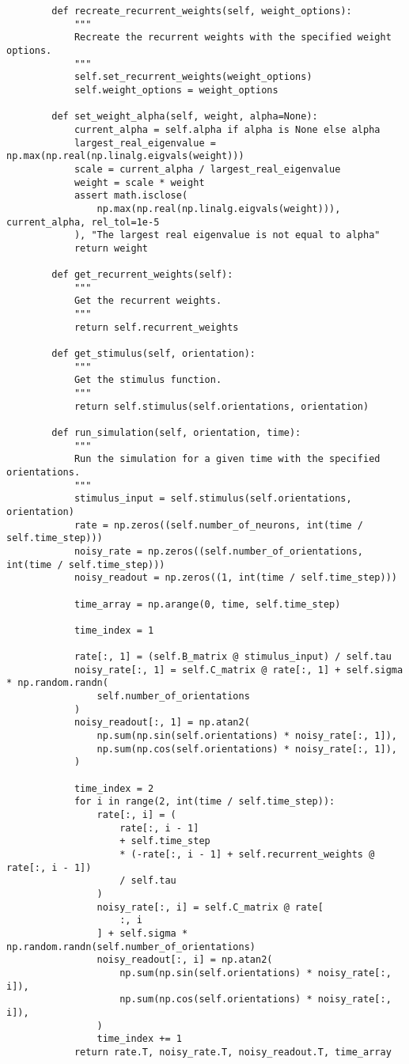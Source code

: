 \documentclass[a4paper, 11pt, oneside]{report}
\begin{document}
\begin{verbatim}
        def recreate_recurrent_weights(self, weight_options):
            """
            Recreate the recurrent weights with the specified weight options.
            """
            self.set_recurrent_weights(weight_options)
            self.weight_options = weight_options
    
        def set_weight_alpha(self, weight, alpha=None):
            current_alpha = self.alpha if alpha is None else alpha
            largest_real_eigenvalue = np.max(np.real(np.linalg.eigvals(weight)))
            scale = current_alpha / largest_real_eigenvalue
            weight = scale * weight
            assert math.isclose(
                np.max(np.real(np.linalg.eigvals(weight))), current_alpha, rel_tol=1e-5
            ), "The largest real eigenvalue is not equal to alpha"
            return weight
    
        def get_recurrent_weights(self):
            """
            Get the recurrent weights.
            """
            return self.recurrent_weights
    
        def get_stimulus(self, orientation):
            """
            Get the stimulus function.
            """
            return self.stimulus(self.orientations, orientation)
    
        def run_simulation(self, orientation, time):
            """
            Run the simulation for a given time with the specified orientations.
            """
            stimulus_input = self.stimulus(self.orientations, orientation)
            rate = np.zeros((self.number_of_neurons, int(time / self.time_step)))
            noisy_rate = np.zeros((self.number_of_orientations, int(time / self.time_step)))
            noisy_readout = np.zeros((1, int(time / self.time_step)))
    
            time_array = np.arange(0, time, self.time_step)
    
            time_index = 1
    
            rate[:, 1] = (self.B_matrix @ stimulus_input) / self.tau
            noisy_rate[:, 1] = self.C_matrix @ rate[:, 1] + self.sigma * np.random.randn(
                self.number_of_orientations
            )
            noisy_readout[:, 1] = np.atan2(
                np.sum(np.sin(self.orientations) * noisy_rate[:, 1]),
                np.sum(np.cos(self.orientations) * noisy_rate[:, 1]),
            )
    
            time_index = 2
            for i in range(2, int(time / self.time_step)):
                rate[:, i] = (
                    rate[:, i - 1]
                    + self.time_step
                    * (-rate[:, i - 1] + self.recurrent_weights @ rate[:, i - 1])
                    / self.tau
                )
                noisy_rate[:, i] = self.C_matrix @ rate[
                    :, i
                ] + self.sigma * np.random.randn(self.number_of_orientations)
                noisy_readout[:, i] = np.atan2(
                    np.sum(np.sin(self.orientations) * noisy_rate[:, i]),
                    np.sum(np.cos(self.orientations) * noisy_rate[:, i]),
                )
                time_index += 1
            return rate.T, noisy_rate.T, noisy_readout.T, time_array
\end{verbatim}
\end{document}
